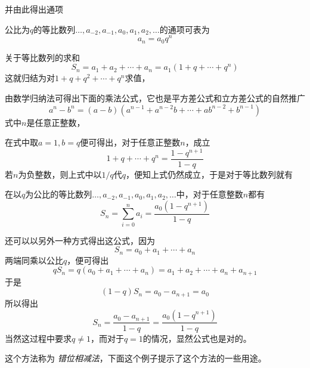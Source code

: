 并由此得出通项
\begin{theorem}
  公比为$q$的等比数列$\ldots,a_{-2},a_{-1},a_0,a_1,a_2,\ldots$的通项可表为
 \[ a_n=a_0q^n \]
\end{theorem}

关于等比数列的求和
\[ S_n = a_1+a_2+\cdots+a_n = a_1(1+q+\cdots+q^{n}) \]
这就归结为对$1+q+q^2+\cdots+q^{n}$求值，

由数学归纳法可得出下面的乘法公式，它也是平方差公式和立方差公式的自然推广
\begin{equation}
  \label{eq:a-power-n-substract-b-power-n}
 a^n-b^n = (a-b)(a^{n-1}+a^{n-2}b+\cdots+ab^{n-2}+b^{n-1}) 
\end{equation}
式中$n$是任意正整数，

在式中取$a=1,b=q$便可得出，对于任意正整数$n$，成立
\[ 1+q+\cdots+q^{n} = \frac{1-q^{n+1}}{1-q} \]
若$n$为负整数，则上式中以$1/q$代$q$，便知上式仍然成立，于是对于等比数列就有
\begin{theorem}
  在以$q$为公比的等比数列$\ldots,a_{-2},a_{-1},a_0,a_1,a_2,\ldots$中，对于任意整数$n$都有
  \[ S_n = \sum_{i=0}^na_i = \frac{a_0(1-q^{n+1})}{1-q} \]
\end{theorem}

还可以以另外一种方式得出这公式，因为
\[ S_n = a_0+a_1+\cdots+a_n \]
两端同乘以公比$q$，便可得出
\[ qS_n = q(a_0+a_1+\cdots+a_n) = a_1+a_2+\cdots+a_n+a_{n+1} \]
于是
\[ (1-q)S_n = a_0-a_{n+1} = a_0 \]
所以得出
\[ S_n = \frac{a_0-a_{n+1}}{1-q} = \frac{a_0(1-q^{n+1})}{1-q} \]
当然这过程中要求$q \neq 1$，而对于$q=1$的情况，显然公式也是对的。

这个方法称为 \emph{错位相减法}，下面这个例子提示了这个方法的一些用途。

